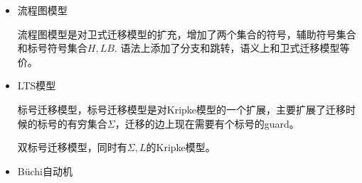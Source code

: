 \documentclass[UTF-8]{ctexart}
\begin{document}
\begin{enumerate}
\begin{itemize}
\item 流程图模型

流程图模型是对卫式迁移模型的扩充，增加了两个集合的符号，辅助符号集合和标号符号集合$H,LB$. 语法上添加了分支和跳转，语义上和卫式迁移模型等价。

\item LTS模型

标号迁移模型，标号迁移模型是对Kripke模型的一个扩展，主要扩展了迁移时候的标号的有穷集合$\Sigma$，迁移的边上现在需要有个标号的guard。

双标号迁移模型，同时有$\Sigma,L$的Kripke模型。

\item B\"uchi自动机

\end{itemize}


\end{enumerate}
\end{document}
